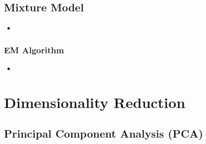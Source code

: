 \documentclass{article}
\begin{document}

\subsection{Mixture Model}

\begin{itemize}
    \item {}
\end{itemize}

\subsubsection{EM Algorithm}
\begin{itemize}
    \item {}
\end{itemize}

\hrfullline
\newpage

\section{Dimensionality Reduction}


\subsection{Principal Component Analysis (PCA)}
\end{document}
